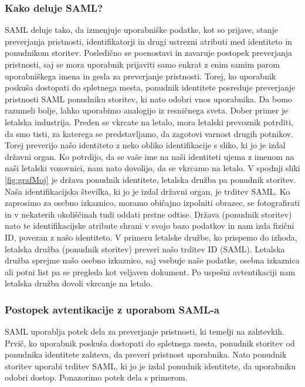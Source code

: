 \documentclass[a4paper,12pt,openright]{book}
\begin{document}
{\subsubsection{Kako deluje SAML?}
SAML deluje tako, da izmenjuje uporabniške podatke, kot so prijave, stanje preverjanja pristnosti, identifikatorji in drugi ustrezni atributi med identiteto in ponudnikom storitev. Posledično se poenostavi in zavaruje postopek preverjanja pristnosti, saj se mora uporabnik prijaviti samo enkrat z enim samim parom uporabniškega imena in gesla za preverjanje pristnosti. Torej, ko uporabnik poskuša dostopati do spletnega mesta, ponudnik identitete posreduje preverjanje pristnosti SAML ponudniku storitev, ki nato odobri vnos uporabnika. Da bomo razumeli bolje, lahko uporabimo analogijo iz resničnega sveta.
\newline
Dober primer je letalska industrija. Preden se vkrcate na letalo, mora letalski prevoznik potrditi, da smo tisti, za katerega se predstavljamo, da zagotovi varnost drugih potnikov. Torej preverijo našo identiteto z neko obliko identifikacije s sliko, ki jo je izdal državni organ. Ko potrdijo, da se vaše ime na naši identiteti ujema z imenom na naši letalski vozovnici, nam nato dovolijo, da se vkrcamo na letalo.
\newline
V spodnji sliki \ref{fig:grafMoj} je država ponudnik identitete, letalska družba pa ponudnik storitev. Naša identifikacijska številka, ki jo je izdal državni organ, je trditev SAML. Ko zaprosimo za osebno izkaznico, moramo običajno izpolniti obrazec, se fotografirati in v nekaterih okoliščinah tudi oddati prstne odtise. Država (ponudnik storitev) nato te identifikacijske atribute shrani v svojo bazo podatkov in nam izda fizični ID, povezan z našo identiteto. V primeru letalske družbe, ko prispemo do izhoda, letalska družba (ponudnik storitev) preveri našo trditev ID (SAML). Letalska družba sprejme našo osebno izkaznico, saj vsebuje naše podatke, osebna izkaznica ali potni list pa se pregleda kot veljaven dokument. Po uspešni avtentikaciji nam letalska družba dovoli vkrcanje na letalo.

\subsubsection{Postopek avtentikacije z uporabom SAML-a}

SAML uporablja potek dela za preverjanje pristnosti, ki temelji na zahtevkih. Prvič, ko uporabnik poskuša dostopati do spletnega mesta, ponudnik storitev od ponudnika identitete zahteva, da preveri pristnost uporabnika. Nato ponudnik storitev uporabi trditev SAML, ki jo je izdal ponudnik identitete, da uporabniku odobri dostop. Ponazorimo potek dela s primerom.

}
\end{document}
